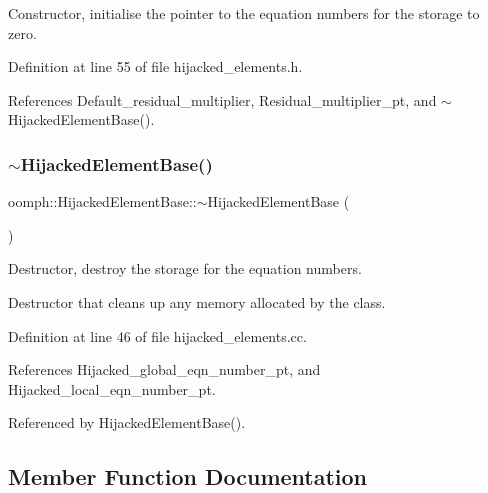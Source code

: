 Constructor, initialise the pointer to the equation numbers for the storage to zero. 



Definition at line 55 of file hijacked\+\_\+elements.\+h.



References Default\+\_\+residual\+\_\+multiplier, Residual\+\_\+multiplier\+\_\+pt, and $\sim$\+Hijacked\+Element\+Base().

\mbox{\label{classoomph_1_1HijackedElementBase_af3393a98fc80a2f7761046920b4a3040}} 
\subsubsection{\texorpdfstring{$\sim$\+Hijacked\+Element\+Base()}{~HijackedElementBase()}}
{\footnotesize\ttfamily oomph\+::\+Hijacked\+Element\+Base\+::$\sim$\+Hijacked\+Element\+Base (\begin{DoxyParamCaption}{ }\end{DoxyParamCaption})\hspace{0.3cm}{\ttfamily [virtual]}}



Destructor, destroy the storage for the equation numbers. 

Destructor that cleans up any memory allocated by the class. 

Definition at line 46 of file hijacked\+\_\+elements.\+cc.



References Hijacked\+\_\+global\+\_\+eqn\+\_\+number\+\_\+pt, and Hijacked\+\_\+local\+\_\+eqn\+\_\+number\+\_\+pt.



Referenced by Hijacked\+Element\+Base().



\subsection{Member Function Documentation}
\mbox{\label{classoomph_1_1HijackedElementBase_ac518df71f978c2b80cd25a1283353ab5}} 
